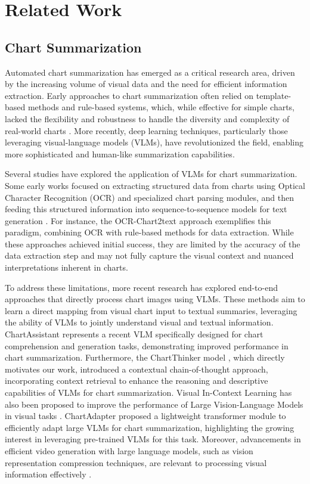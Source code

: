 \section{Related Work}

\subsection{Chart Summarization}

Automated chart summarization has emerged as a critical research area, driven by the increasing volume of visual data and the need for efficient information extraction. Early approaches to chart summarization often relied on template-based methods and rule-based systems, which, while effective for simple charts, lacked the flexibility and robustness to handle the diversity and complexity of real-world charts \cite{TemplateChartSum}. More recently, deep learning techniques, particularly those leveraging visual-language models (VLMs), have revolutionized the field, enabling more sophisticated and human-like summarization capabilities.

Several studies have explored the application of VLMs for chart summarization. Some early works focused on extracting structured data from charts using Optical Character Recognition (OCR) and specialized chart parsing modules, and then feeding this structured information into sequence-to-sequence models for text generation \cite{OCRChartSum,StructChartSum}. For instance, the OCR-Chart2text approach \cite{OCRChart2text} exemplifies this paradigm, combining OCR with rule-based methods for data extraction. While these approaches achieved initial success, they are limited by the accuracy of the data extraction step and may not fully capture the visual context and nuanced interpretations inherent in charts.

To address these limitations, more recent research has explored end-to-end approaches that directly process chart images using VLMs. These methods aim to learn a direct mapping from visual chart input to textual summaries, leveraging the ability of VLMs to jointly understand visual and textual information. ChartAssistant \cite{ChartAssistant2024} represents a recent VLM specifically designed for chart comprehension and generation tasks, demonstrating improved performance in chart summarization.  Furthermore, the ChartThinker model \cite{ChartThinker2024}, which directly motivates our work, introduced a contextual chain-of-thought approach, incorporating context retrieval to enhance the reasoning and descriptive capabilities of VLMs for chart summarization.  Visual In-Context Learning has also been proposed to improve the performance of Large Vision-Language Models in visual tasks \cite{zhou2024visual}. ChartAdapter \cite{ChartAdapter2024} proposed a lightweight transformer module to efficiently adapt large VLMs for chart summarization, highlighting the growing interest in leveraging pre-trained VLMs for this task.  Moreover, advancements in efficient video generation with large language models, such as vision representation compression techniques, are relevant to processing visual information effectively \cite{zhou2024less}.


